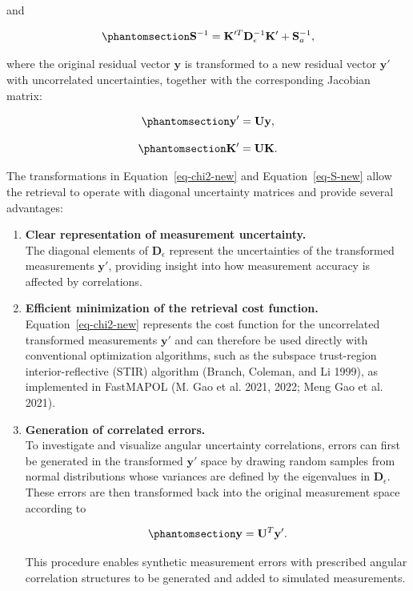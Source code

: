 \documentclass[
  letterpaper,
  open=any]{scrbook}
\begin{document}
and

\begin{equation}\phantomsection\label{eq-S-new}{
\mathbf{S}^{-1}
=
\mathbf{K}'^{T}
\mathbf{D}_{\epsilon}^{-1}
\mathbf{K}'
+
\mathbf{S}_{a}^{-1},
}\end{equation}

where the original residual vector \(\mathbf{y}\) is transformed to a
new residual vector \(\mathbf{y}'\) with uncorrelated uncertainties,
together with the corresponding Jacobian matrix:

\begin{equation}\phantomsection\label{eq-y-transform}{
\mathbf{y}'
=
\mathbf{U}\mathbf{y},
}\end{equation}

\begin{equation}\phantomsection\label{eq-K-transform}{
\mathbf{K}'
=
\mathbf{U}\mathbf{K}.
}\end{equation}

The transformations in Equation~\ref{eq-chi2-new} and
Equation~\ref{eq-S-new} allow the retrieval to operate with diagonal
uncertainty matrices and provide several advantages:

\begin{enumerate}
\def\labelenumi{\arabic{enumi}.}
\item
  \textbf{Clear representation of measurement uncertainty.}\\
  The diagonal elements of \(\mathbf{D}_{\epsilon}\) represent the
  uncertainties of the transformed measurements \(\mathbf{y}'\),
  providing insight into how measurement accuracy is affected by
  correlations.
\item
  \textbf{Efficient minimization of the retrieval cost function.}\\
  Equation~\ref{eq-chi2-new} represents the cost function for the
  uncorrelated transformed measurements \(\mathbf{y}'\) and can
  therefore be used directly with conventional optimization algorithms,
  such as the subspace trust-region interior-reflective (STIR) algorithm
  (Branch, Coleman, and Li 1999), as implemented in FastMAPOL (M. Gao et
  al. 2021, 2022; Meng Gao et al. 2021).
\item
  \textbf{Generation of correlated errors.}\\
  To investigate and visualize angular uncertainty correlations, errors
  can first be generated in the transformed \(\mathbf{y}'\) space by
  drawing random samples from normal distributions whose variances are
  defined by the eigenvalues in \(\mathbf{D}_{\epsilon}\). These errors
  are then transformed back into the original measurement space
  according to

  \begin{equation}\phantomsection\label{eq-y-inverse-transform}{
  \mathbf{y}
  =
  \mathbf{U}^{T}\mathbf{y}'.
  }\end{equation}

  This procedure enables synthetic measurement errors with prescribed
  angular correlation structures to be generated and added to simulated
  measurements.
\end{enumerate}
\end{document}
